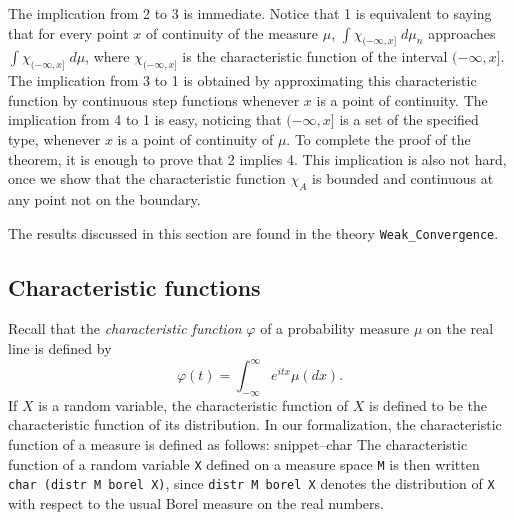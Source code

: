 \documentclass{svjour3}
\newcommand{\ph}{\varphi}
\newcommand{\Snippet}[1]{\csname snippet--#1\endcsname}
\begin{document}
The implication from 2 to 3 is immediate. Notice that 1 is equivalent to saying that for every point $x$ of continuity of the measure $\mu$, $\int \chi_{(-\infty,x]} \; d\mu_n$ approaches $\int \chi_{(-\infty,x]} \; d\mu$, where $\chi_{(-\infty,x]}$ is the characteristic function of the interval $(-\infty,x]$. The implication from 3 to 1 is obtained by approximating this characteristic function by continuous step functions whenever $x$ is a point of continuity. The implication from 4 to 1 is easy, noticing that $(-\infty,x]$ is a set of the specified type, whenever $x$ is a point of continuity of $\mu$. To complete the proof of the theorem, it is enough to prove that 2 implies 4. This implication is also not hard, once we show that the characteristic function $\chi_A$ is bounded and continuous at any point not on the boundary.

The results discussed in this section are found in the theory \texttt{Weak\_Convergence}.

\subsection{Characteristic functions}
\label{subsection:characteristic}

Recall that the \emph{characteristic function} $\ph$ of a probability measure $\mu$ on the real line is defined by
\[
\ph(t) = \int_{-\infty}^{\infty} e^{itx} \mu(dx).
\]
If $X$ is a random variable, the characteristic function of $X$ is defined to be the characteristic function of its distribution.
In our formalization, the characteristic function of a measure is defined as follows:
\Snippet{char}
The characteristic function of a random variable \texttt{X} defined on a measure space \texttt{M} is then written \texttt{char (distr M borel X)}, since \texttt{distr M borel X} denotes the distribution of \texttt{X} with respect to the usual Borel measure on the real numbers.
\end{document}
